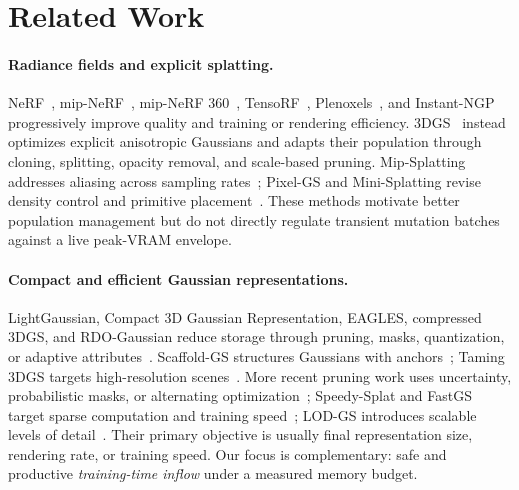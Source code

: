 \section{Related Work}
\paragraph{Radiance fields and explicit splatting.}
NeRF~\cite{mildenhall2020nerf}, mip-NeRF~\cite{barron2021mipnerf}, mip-NeRF 360~\cite{barron2022mipnerf360}, TensoRF~\cite{chen2022tensorf}, Plenoxels~\cite{fridovichkeil2022plenoxels}, and Instant-NGP~\cite{muller2022instant} progressively improve quality and training or rendering efficiency. 3DGS~\cite{kerbl2023gaussians} instead optimizes explicit anisotropic Gaussians and adapts their population through cloning, splitting, opacity removal, and scale-based pruning. Mip-Splatting addresses aliasing across sampling rates~\cite{yu2024mipsplatting}; Pixel-GS and Mini-Splatting revise density control and primitive placement~\cite{cheng2024pixelgs,fang2024minisplatting}. These methods motivate better population management but do not directly regulate transient mutation batches against a live peak-VRAM envelope.

\paragraph{Compact and efficient Gaussian representations.}
LightGaussian, Compact 3D Gaussian Representation, EAGLES, compressed 3DGS, and RDO-Gaussian reduce storage through pruning, masks, quantization, or adaptive attributes~\cite{fan2024lightgaussian,lee2024compact,girish2024eagles,niedermayr2024compressed,wang2024rdo}. Scaffold-GS structures Gaussians with anchors~\cite{lu2024scaffold}; Taming 3DGS targets high-resolution scenes~\cite{mallick2024taming}. More recent pruning work uses uncertainty, probabilistic masks, or alternating optimization~\cite{hanson2025pup,liu2025maskgaussian,zhang2025gaussianspa}; Speedy-Splat and FastGS target sparse computation and training speed~\cite{hanson2025speedysplat,ren2026fastgs}; LOD-GS introduces scalable levels of detail~\cite{shen2025lodgs}. Their primary objective is usually final representation size, rendering rate, or training speed. Our focus is complementary: safe and productive \emph{training-time inflow} under a measured memory budget.

